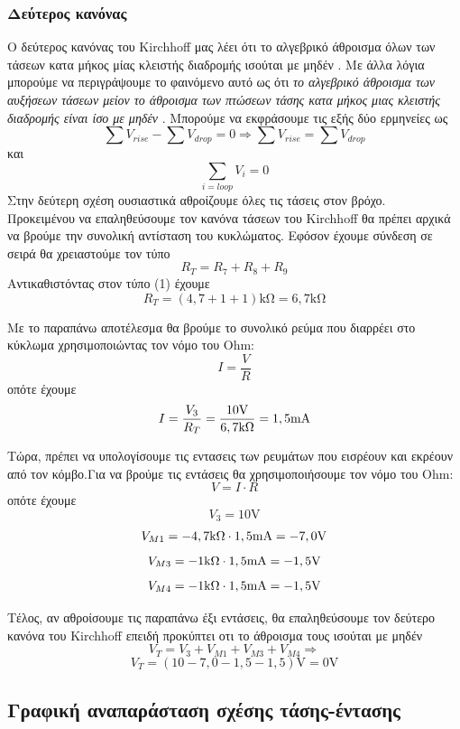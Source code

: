 \documentclass{article}
\begin{document}
\subsubsection{Δεύτερος κανόνας}
Ο δεύτερος κανόνας του Kirchhoff μας λέει ότι το αλγεβρικό άθροισμα όλων των τάσεων
κατα μήκος μίας κλειστής διαδρομής ισούται με μηδέν \cite{papadopoulos}.
Με άλλα λόγια μπορούμε να περιγράψουμε το φαινόμενο αυτό ως ότι \textit{το αλγεβρικό
άθροισμα των αυξήσεων τάσεων μείον το άθροισμα των πτώσεων τάσης κατα μήκος μιας
κλειστής διαδρομής είναι ίσο με μηδέν} \cite{mcallister}.
Μπορούμε να εκφράσουμε τις εξής δύο ερμηνείες ως
\[\sum{V_{rise}} - \sum{V_{drop}} = 0 \Rightarrow \sum{V_{rise}} = \sum{V_{drop}}\]
και
\[\sum_{i = loop}{V_{i}} = 0\]
Στην δεύτερη σχέση ουσιαστικά αθροίζουμε όλες τις τάσεις στον βρόχο. \\
Προκειμένου να επαληθεύσουμε τον κανόνα τάσεων του Kirchhoff θα πρέπει
αρχικά να βρούμε την συνολική αντίσταση του κυκλώματος. Εφόσον έχουμε σύνδεση
σε σειρά θα χρειαστούμε τον τύπο
\begin{equation}
	R_T = R_7 + R_8 + R_9
\end{equation}
Αντικαθιστόντας στον τύπο (1) έχουμε
\[R_T = \si{(4,7 + 1 + 1)\kohm} = \si{6,7\kohm}\]
	
Με το παραπάνω αποτέλεσμα θα βρούμε το συνολικό ρεύμα που διαρρέει
στο κύκλωμα χρησιμοποιώντας τον	νόμο του Ohm:
\begin{equation}
	I = \frac{V}{R}
\end{equation}
οπότε έχουμε
\[I = \frac{V_3}{R_T} = \si{\frac{10\volt}{6,7\kohm}} = \si{1,5\milli\ampere}\]

Τώρα, πρέπει να υπολογίσουμε τις εντασεις των ρευμάτων που εισρέουν
και εκρέουν από τον κόμβο.Για να βρούμε τις εντάσεις θα χρησιμοποιήσουμε
τον νόμο του Ohm:
\begin{equation}
	V = I \cdot {R}		
\end{equation}
οπότε έχουμε
\[V_3 =	\si{10\volt}\]
\[V_{M1} = \si{-4,7\kohm \cdot {1,5\milli\ampere}} = \si{-7,0\volt}\]
\[V_{M3} = \si{-1\kohm \cdot {1,5\milli\ampere}} = \si{-1,5\volt}\]
\[V_{M4} = \si{-1\kohm \cdot {1,5\milli\ampere}} = \si{-1,5\volt}\]

Τέλος, αν αθροίσουμε τις παραπάνω έξι εντάσεις, θα επαληθεύσουμε τον
δεύτερο κανόνα του Kirchhoff επειδή προκύπτει οτι το άθροισμα
τους ισούται με μηδέν
\[V_T = V_3 + V_{M1} + V_{M3} + V_{M4} \Rightarrow \]
\[V_T = \si{(10 - 7,0 - 1,5 - 1,5)\volt} = \si{0\volt}\]

\subsection{Γραφική αναπαράσταση σχέσης τάσης-έντασης}
\end{document}
